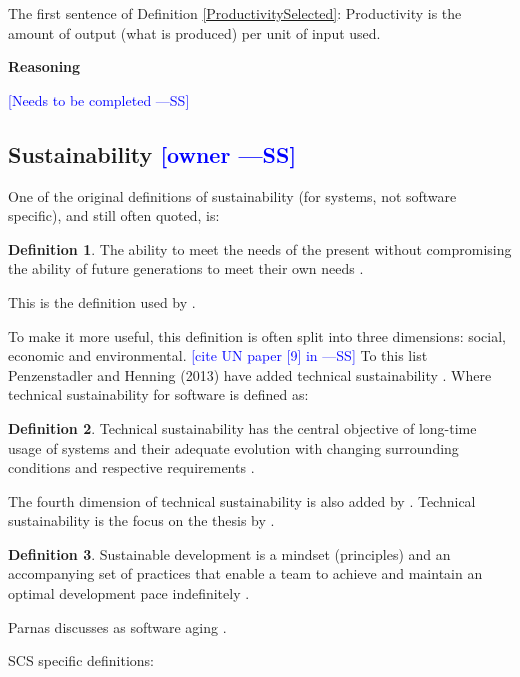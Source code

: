\documentclass[letterpaper,cleveref]{lipics-v2019}
\newcommand{\authornote}[3]{\textcolor{#1}{[#3 ---#2]}}
\newcommand{\authornote}[3]{}
\newcommand{\wss}[1]{\authornote{blue}{SS}{#1}} %
\theoremstyle{definition}
\newtheorem{defn}{Definition}
\begin{document}
The first sentence of Definition \ref{ProductivitySelected}: Productivity is the
amount of output (what is produced) per unit of input used.

\noindent \textbf{Reasoning}

\wss{Needs to be completed}

\subsection{Sustainability \wss{owner}}

One of the original definitions of sustainability (for systems, not software
specific), and still often quoted, is:

\begin{defn}
\noindent The ability to meet the needs of the present without compromising the ability of
future generations to meet their own needs \citep{Brundtland1987}.
\end{defn}

This is the definition used by \citet{IISD2019}.

To make it more useful, this definition is often split into three dimensions:
social, economic and environmental. \wss{cite UN paper [9] in
  \citet{PenzenstadlerAndHenning2013}}  To this list Penzenstadler and Henning
(2013) have added technical sustainability \citep{PenzenstadlerAndHenning2013}.
Where technical sustainability for software is defined as:

\begin{defn}
\noindent Technical sustainability has the central objective of long-time
usage of systems and their adequate evolution with changing surrounding
conditions and respective requirements \citep{PenzenstadlerAndHenning2013}.
\end{defn}

The fourth dimension of technical sustainability is also added
by \citep{WolframEtAl2017}.  Technical sustainability is the focus on the thesis
by \citet{Hygerth2016}.

\begin{defn}
  \noindent Sustainable development is a mindset (principles) and an
  accompanying set of practices that enable a team to achieve and maintain an
  optimal development pace indefinitely \citep{Tate2005}.
\end{defn}

Parnas discusses as software aging \citep{Parnas1994a}.

SCS specific definitions:
\end{document}
